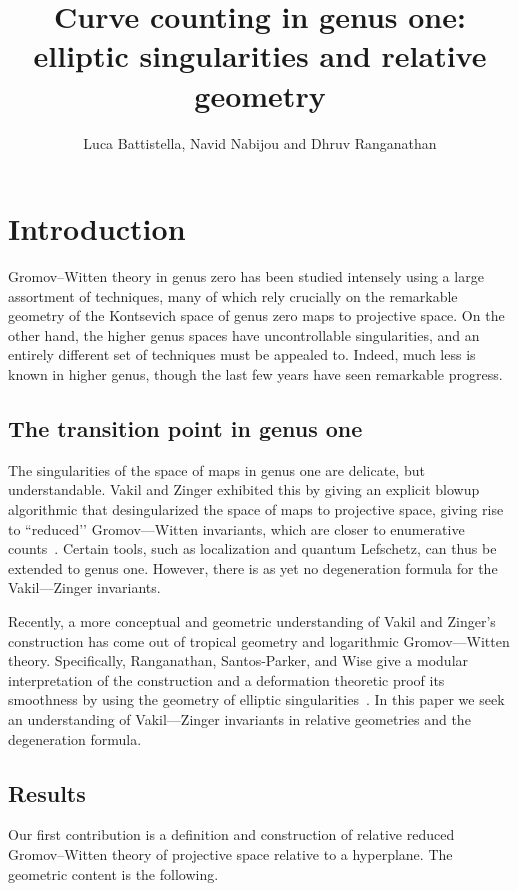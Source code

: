 \documentclass[11pt]{amsart}
\title{Curve counting in genus one: elliptic singularities and relative geometry}
\author{Luca Battistella, Navid Nabijou and Dhruv Ranganathan}
\date{\thismonthyear}
\theoremstyle{definition}
\theoremstyle{definition}
\begin{document}
\begin{abstract}
\end{abstract}

\maketitle

\appendixtitletocoff
\tableofcontents


\section*{Introduction}

\noindent Gromov--Witten theory in genus zero has been studied intensely using a large assortment of techniques, many of which rely crucially on the remarkable geometry of the Kontsevich space of genus zero maps to projective space. On the other hand, the higher genus spaces have uncontrollable singularities, and an entirely different set of techniques must be appealed to. Indeed, much less is known in higher genus, though the last few years have seen remarkable progress. 

\subsection{The transition point in genus one} The singularities of the space of maps in genus one are delicate, but understandable. Vakil and Zinger exhibited this by giving an explicit blowup algorithmic that desingularized the space of maps to projective space, giving rise to ``reduced’’ Gromov—Witten invariants, which are closer to enumerative counts~\cite{VZ}. Certain tools, such as localization and quantum Lefschetz, can thus be extended to genus one. However, there is as yet no degeneration formula for the Vakil—Zinger invariants. 

Recently, a more conceptual and geometric understanding of Vakil and Zinger’s construction has come out of tropical geometry and logarithmic Gromov—Witten theory. Specifically, Ranganathan, Santos-Parker, and Wise give a modular interpretation of the construction and a deformation theoretic proof its smoothness by using the geometry of elliptic singularities~\cite{RSPW,RSPW2}. In this paper we seek an understanding of Vakil—Zinger invariants in relative geometries and the degeneration formula.

\subsection{Results} Our first contribution is a definition and construction of relative reduced Gromov--Witten theory of projective space relative to a hyperplane. The geometric content is the following.
\end{document}
